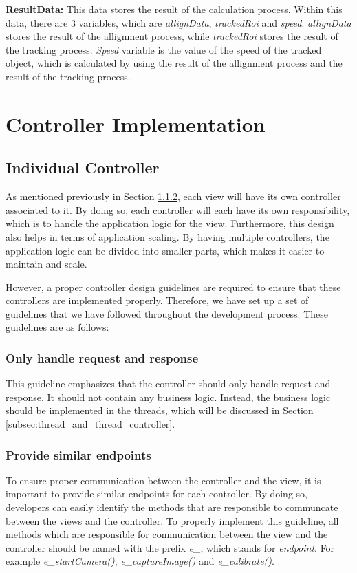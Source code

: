 \textbf{ResultData:} This data stores the result of the calculation process. Within this data, there are 3 variables, which are \textit{allignData}, \textit{trackedRoi} and \textit{speed}. \textit{allignData} stores the result of the allignment process, while \textit{trackedRoi} stores the result of the tracking process. \textit{Speed} variable is the value of the speed of the tracked object, which is calculated by using the result of the allignment process and the result of the tracking process.

\section{Controller Implementation}
\label{sec:controller_implementation}

\subsection{Individual Controller}
\label{subsec:individual_controller}

As mentioned previously in Section \ref{}, each view will have its own controller associated to it. By doing so, each controller will each have its own responsibility, which is to handle the application logic for the view. Furthermore, this design also helps in terms of application scaling. By having multiple controllers, the application logic can be divided into smaller parts, which makes it easier to maintain and scale.

However, a proper controller design guidelines are required to ensure that these controllers are implemented properly. Therefore, we have set up a set of guidelines that we have followed throughout the development process. These guidelines are as follows:

\subsubsection{Only handle request and response}
This guideline emphasizes that the controller should only handle request and response. It should not contain any business logic. Instead, the business logic should be implemented in the threads, which will be discussed in Section \ref{subsec:thread_and_thread_controller}.

\subsubsection{Provide similar endpoints}
To ensure proper communication between the controller and the view, it is important to provide similar endpoints for each controller. By doing so, developers can easily identify the methods that are responsible to communcate between the views and the controller. To properly implement this guideline, all methods which are responsible for communication between the view and the controller should be named with the prefix \textit{e\_}, which stands for \textit{endpoint}. For example \textit{e\_startCamera()}, \textit{e\_captureImage()} and \textit{e\_calibrate()}.


